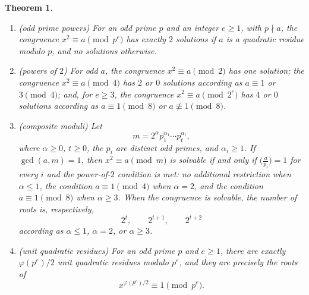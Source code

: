 \documentclass[11pt]{article}
\theoremstyle{ntstyle}
\newtheorem{theorem}{Theorem}[subsection]
\newcommand{\statementitems}{\mbox{}}
\newcommand{\legs}[2]{\bigl(\tfrac{#1}{#2}\bigr)}
\begin{document}
\begin{theorem}\label{thm:7.8.4}\statementitems

	\begin{enumerate}[label={\alph*)}]
		\item (odd prime powers) For an odd prime $p$ and an integer $e\ge1$,
					with $p\nmid a$, the congruence
					$x^2\equiv a\pmod{p^e}$ has exactly $2$ solutions if $a$ is a
					quadratic residue modulo $p$, and no solutions otherwise.
		\item (powers of $2$) For odd $a$, the congruence
					$x^2\equiv a\pmod{2}$ has one solution;
					the congruence $x^2\equiv a\pmod{4}$ has $2$ or $0$ solutions according as
					$a\equiv1$ or $3\pmod{4}$; and, for $e\ge3$,
					the congruence $x^2\equiv a\pmod{2^e}$ has $4$ or $0$ solutions according as
					$a\equiv1\pmod{8}$ or $a\not\equiv1\pmod{8}$.
		\item (composite moduli) Let
					\[
						m=2^\alpha p_1^{\alpha_1}\cdots p_t^{\alpha_t},
					\]
					where $\alpha\ge0$, $t\ge0$, the $p_i$ are distinct odd primes, and
					$\alpha_i\ge1$. If $\gcd(a,m)=1$, then
					$x^2\equiv a\pmod{m}$ is solvable if and only if
					$\legs{a}{p_i}=1$ for every $i$ and the power-of-$2$ condition is met:
					no additional restriction when $\alpha\le1$,
					the condition $a\equiv1\pmod{4}$ when $\alpha=2$, and
					the condition $a\equiv1\pmod{8}$ when $\alpha\ge3$. When the congruence is solvable, the number
					of roots is, respectively,
					\[
						2^t,\qquad 2^{t+1},\qquad 2^{t+2}
					\]
					according as $\alpha\le1$, $\alpha=2$, or $\alpha\ge3$.
		\item (unit quadratic residues) For an odd prime $p$ and
					$e\ge1$, there are exactly $\varphi(p^e)/2$ unit quadratic
					residues modulo $p^e$, and they are precisely the roots of
					\[
						x^{\varphi(p^e)/2}\equiv1\pmod{p^e}.
					\]
	\end{enumerate}
\end{theorem}
\end{document}
